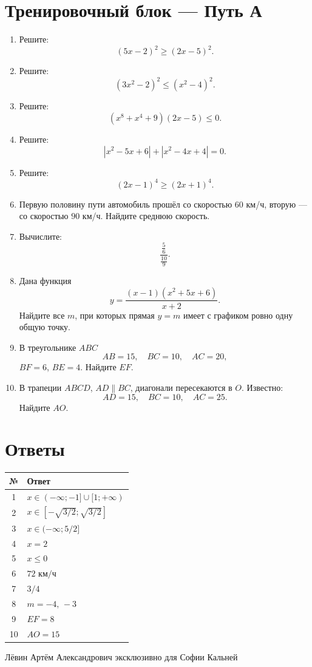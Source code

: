 \documentclass[a4paper,12pt]{article}
\begin{document}
\clearpage
\section*{\color{darkaccent}Тренировочный блок --- Путь А}

\begin{enumerate}
\item Решите:
\[
(5x-2)^2\ge(2x-5)^2.
\]

\item Решите:
\[
(3x^2-2)^2\le(x^2-4)^2.
\]

\item Решите:
\[
(x^8+x^4+9)(2x-5)\le0.
\]

\item Решите:
\[
|x^2-5x+6|+|x^2-4x+4|=0.
\]

\item Решите:
\[
(2x-1)^4\ge(2x+1)^4.
\]

\item Первую половину пути автомобиль прошёл со скоростью \(60\) км/ч, вторую --- со скоростью \(90\) км/ч. Найдите среднюю скорость.

\item Вычислите:
\[
\frac{\frac56}{\frac{10}{9}}.
\]

\item Дана функция
\[
y=\frac{(x-1)(x^2+5x+6)}{x+2}.
\]
Найдите все \(m\), при которых прямая \(y=m\) имеет с графиком ровно одну общую точку.

\item В треугольнике \(ABC\)
\[
AB=15,\quad BC=10,\quad AC=20,
\]
\(BF=6\), \(BE=4\). Найдите \(EF\).

\item В трапеции \(ABCD\), \(AD\parallel BC\), диагонали пересекаются в \(O\). Известно:
\[
AD=15,\quad BC=10,\quad AC=25.
\]
Найдите \(AO\).
\end{enumerate}

\clearpage
\section*{\color{darkaccent}Ответы}

\renewcommand{\arraystretch}{1.5}
\begin{center}
\begin{tabularx}{\linewidth}{@{}cX@{}}
\toprule
\textbf{№} & \textbf{Ответ} \\
\midrule
1 & \(x\in(-\infty;-1]\cup[1;+\infty)\) \\
2 & \(x\in[-\sqrt{3/2};\sqrt{3/2}]\) \\
3 & \(x\in(-\infty;5/2]\) \\
4 & \(x=2\) \\
5 & \(x\le0\) \\
6 & \(72\text{ км/ч}\) \\
7 & \(3/4\) \\
8 & \(m=-4,\,-3\) \\
9 & \(EF=8\) \\
10 & \(AO=15\) \\
\bottomrule
\end{tabularx}
\end{center}

\vfill
\begin{center}
{\small\color{darkaccent}
Лёвин Артём Александрович эксклюзивно для Софии Кальней}
\end{center}
\end{document}
